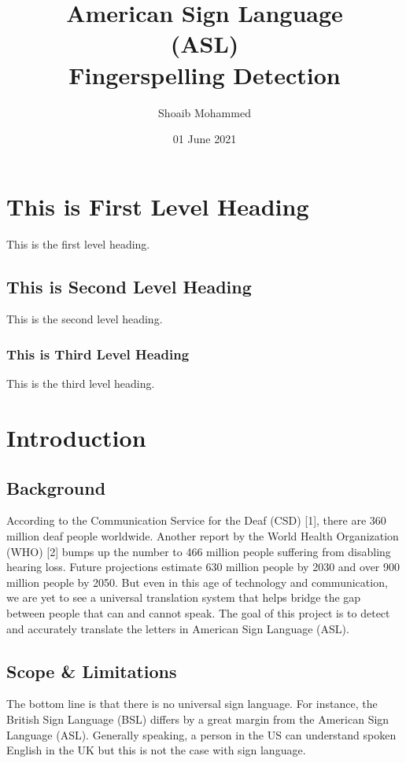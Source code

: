 \documentclass[12pt]{article}
\title{American Sign Language\\
	(ASL)\\
	Fingerspelling Detection}
\author{Shoaib Mohammed}
\date{01 June 2021}
\begin{document}
\begin{titlepage}
\maketitle
\thispagestyle{empty}
\end{titlepage}

\section{This is First Level Heading}
This is the first level heading.

\subsection{This is Second Level Heading}
This is the second level heading.

\subsubsection{This is Third Level Heading}
This is the third level heading.

\section{Introduction}

\subsection{Background}
According to the Communication Service for the Deaf (CSD) [1], there are 360 
million deaf people worldwide. Another report by the World Health 
Organization (WHO) [2] bumps up the number to 466 million people suffering 
from disabling hearing loss. Future projections estimate 630 million people by 
2030 and over 900 million people by 2050. But even in this age of technology 
and communication, we are yet to see a universal translation system that helps 
bridge the gap between people that can and cannot speak. The goal of this 
project is to detect and accurately translate the letters in American Sign 
Language (ASL).

\subsection{Scope \& Limitations}
The bottom line is that there is no universal sign language. For instance, the 
British Sign Language (BSL) differs by a great margin from the American Sign 
Language (ASL). Generally speaking, a person in the US can understand spoken 
English in the UK but this is not the case with sign language.
\end{document}
